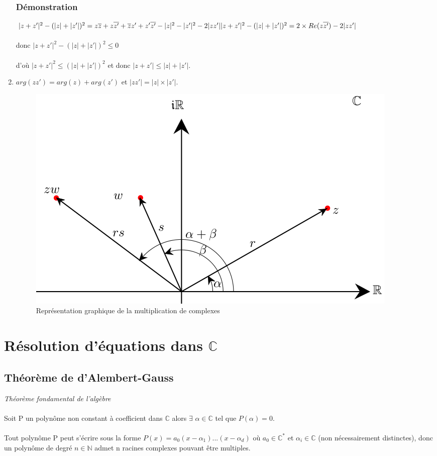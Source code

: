 \documentclass[a4paper,10pt]{book}
\newcommand{\N}{\mathbb{N}}
\newcommand{\C}{\mathbb{C}}
\begin{document}
\begin{enumerate}
\subsubsection{Démonstration}
$|z+z'|^{2}-(|z|+|z'|)^{2} = z\overline{z}+z\overline{z'}+\overline{z}z'+z'\overline{z'}-|z|^{2}-|z'|^{2}-2|zz'| \\
|z+z'|^{2}-(|z|+|z'|)^{2}=2\times Re(z\overline{z'})-2|zz'|$\\\\
donc $|z+z'|^{2}-(|z|+|z'|)^{2} \leq 0$\\\\
d'où $|z+z'|^{2}\leq(|z|+|z'|)^{2}$ et donc $|z+z'| \leq |z| + |z'|$.\\
\item $arg(zz')=arg(z)+arg(z')$ et $|zz'|=|z|\times |z'|$.
\begin{figure}[h] \begin{center}
\includegraphics[scale=0.375]{images/203.png}
\caption{Représentation graphique de la multiplication de complexes}
\end{center} \end{figure}
\end{enumerate}

\section{Résolution d'équations dans $\C$}
\subsection{Théorème de d'Alembert-Gauss}
\textit{Théorème fondamental de l'algèbre}\\\\
Soit P un polynôme non constant à coefficient dans $\C$ alors $\exists$ $\alpha \in \C$ tel que $P(\alpha)=0$.\\\\
Tout polynôme P peut s’écrire sous la forme $P(x)=a_{0}(x-\alpha_{1})...(x-\alpha_{d})$
où $a_{0} \in \C^{*}$ et $\alpha_{i} \in \C$ (non nécessairement distinctes), donc un polynôme de degré $n\in\N$ admet n racines complexes pouvant être multiples.
\end{document}
